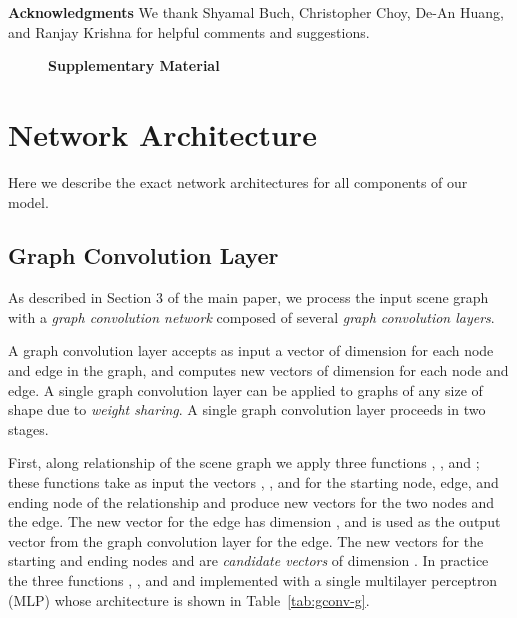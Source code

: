 \documentclass[10pt,twocolumn,letterpaper]{article}
\begin{document}
\textbf{Acknowledgments} We thank Shyamal Buch, Christopher Choy, De-An Huang, and Ranjay Krishna for helpful comments and suggestions.

{\small


}

\clearpage
\appendix
\begin{figure}[ht!]
  \centering
  \Large\textbf{Supplementary Material}
\end{figure}
\section{Network Architecture}
Here we describe the exact network architectures for all components of our model.

\subsection{Graph Convolution Layer}
As described in Section 3 of the main paper, we process the input scene graph with a \emph{graph convolution network} composed of several \emph{graph convolution layers}.


A graph convolution layer accepts as input a vector of dimension  for each node and edge in the graph, and computes new vectors of dimension  for each node and edge. A single graph convolution layer can be applied to graphs of any size of shape due to \emph{weight sharing}. A single graph convolution layer proceeds in two stages.

First, along relationship of the scene graph we apply three functions , , and ; these functions take as input the vectors , , and  for the starting node, edge, and ending node of the relationship and produce new vectors for the two nodes and the edge. The new vector for the edge  has dimension , and is used as the output vector from the graph convolution layer for the edge. The new vectors for the starting and ending nodes  and  are \emph{candidate vectors} of dimension . In practice the three functions , , and  and implemented with a single multilayer perceptron (MLP) whose architecture is shown in Table~\ref{tab:gconv-g}.
\end{document}
